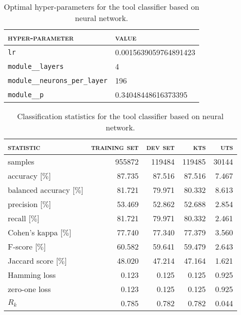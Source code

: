\begin{table}[H]
	\centering
	\begin{tabular}{ll}
		\toprule
		\textsc{hyper-parameter} & \textsc{value}\\
		\midrule
		\verb|lr| & 0.0015639059764891423\\
		\verb|module__layers| & 4\\
		\verb|module__neurons_per_layer| & 196\\
		\verb|module__p| & 0.34048448616373395\\
		\bottomrule
	\end{tabular}
	\caption{Optimal hyper-parameters for the tool classifier based on neural network.}
	\label{tab:hyperparameters_application_short_neural_network}
\end{table}
\begin{table}[H]
	\centering
	\begin{tabular}{lrrrr}
		\toprule
		\textsc{statistic} & \textsc{training set} & \textsc{dev set} & \textsc{kts} & \textsc{uts}\\
		\midrule
		samples & 955872 & 119484 & 119485 & 30144\\
		accuracy [$\%$] & 87.735 & 87.516 & 87.516 & 7.467\\
		balanced accuracy [$\%$] & 81.721 & 79.971 & 80.332 & 8.613\\
		precision [$\%$] & 53.469 & 52.862 & 52.688 & 2.854\\
		recall [$\%$] & 81.721 & 79.971 & 80.332 & 2.461\\
		Cohen’s kappa [$\%$] & 77.740 & 77.340 & 77.379 & 3.560\\
		F-score [$\%$] & 60.582 & 59.641 & 59.479 & 2.643\\
		Jaccard score [$\%$] & 48.020 & 47.214 & 47.164 & 1.621\\
		Hamming loss & 0.123 & 0.125 & 0.125 & 0.925\\
		zero-one loss & 0.123 & 0.125 & 0.125 & 0.925\\
		$R_k$ & 0.785 & 0.782 & 0.782 & 0.044\\
		\bottomrule
	\end{tabular}
	\caption{Classification statistics for the tool classifier based on neural network.}
	\label{tab:classification_application_short_neural_network}
\end{table}
